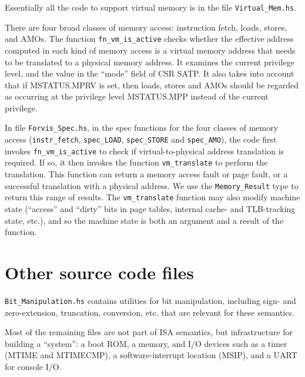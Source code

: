 \documentclass[11pt]{article}
\begin{document}
\label{sec_vm}

Essentially all the code to support virtual memory is in the file
\verb|Virtual_Mem.hs|.

There are four broad classes of memory access: instruction fetch,
loads, stores, and AMOs.  The function \verb|fn_vm_is_active| checks
whether the effective address computed in each kind of memory access
is a virtual memory address that needs to be translated to a physical
memory address.  It examines the current privilege level, and the
value in the ``mode'' field of CSR SATP.  It also takes into account
that if MSTATUS.MPRV is set, then loads, stores and AMOs should be
regarded as occurring at the privilege level MSTATUS.MPP instead of
the current privilege.



In file \verb|Forvis_Spec.hs|, in the spec functions for the four
classes of memory access (\verb|instr_fetch|, \verb|spec_LOAD|,
\verb|spec_STORE| and \verb|spec_AMO|), the code first invokes
\verb|fn_vm_is_active| to check if virtual-to-physical address
translation is required.  If so, it then invokes the function
\verb|vm_translate| to perform the translation.  This function can
return a memory access fault or page fault, or a successful
translation with a physical address.  We use the \verb|Memory_Result|
type to return this range of results.  The \verb|vm_translate|
function may also modify machine state (``access'' and ``dirty'' bits
in page tables, internal cache- and TLB-tracking state, etc.), and so
the machine state is both an argument and a result of the function.




\section{Other source code files}

\label{sec_misc}

\verb|Bit_Manipulation.hs| contains utilities for bit manipulation,
including sign- and zero-extension, truncation, conversion, etc. that
are relevant for these semantics.

Most of the remaining files are not part of ISA semantics, but
infrastructure for building a ``system'': a boot ROM, a memory, and
I/O devices such as a timer (MTIME and MTIMECMP), a software-interrupt
location (MSIP), and a UART for console I/O.
\end{document}
